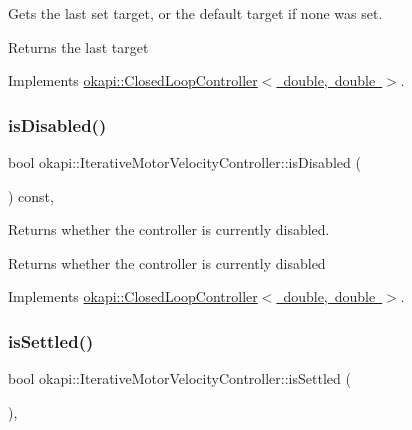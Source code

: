 Gets the last set target, or the default target if none was set.

\begin{DoxyReturn}{Returns}
the last target 
\end{DoxyReturn}


Implements \mbox{\hyperlink{classokapi_1_1ClosedLoopController_a22012bedbfaff6e5a3a508f274ec2497}{okapi\+::\+Closed\+Loop\+Controller$<$ double, double $>$}}.

\mbox{\label{classokapi_1_1IterativeMotorVelocityController_a3d0383caf0fb0b982806e224492af473}} 
\subsubsection{\texorpdfstring{isDisabled()}{isDisabled()}}
{\footnotesize\ttfamily bool okapi\+::\+Iterative\+Motor\+Velocity\+Controller\+::is\+Disabled (\begin{DoxyParamCaption}{ }\end{DoxyParamCaption}) const\hspace{0.3cm}{\ttfamily [override]}, {\ttfamily [virtual]}}

Returns whether the controller is currently disabled.

\begin{DoxyReturn}{Returns}
whether the controller is currently disabled 
\end{DoxyReturn}


Implements \mbox{\hyperlink{classokapi_1_1ClosedLoopController_a40bd4ec2b8c75503fbf6f494fd7cbe69}{okapi\+::\+Closed\+Loop\+Controller$<$ double, double $>$}}.

\mbox{\label{classokapi_1_1IterativeMotorVelocityController_ade18c38b1ec3196b25b0ea323d8e1075}} 
\subsubsection{\texorpdfstring{isSettled()}{isSettled()}}
{\footnotesize\ttfamily bool okapi\+::\+Iterative\+Motor\+Velocity\+Controller\+::is\+Settled (\begin{DoxyParamCaption}{ }\end{DoxyParamCaption})\hspace{0.3cm}{\ttfamily [override]}, {\ttfamily [virtual]}}

